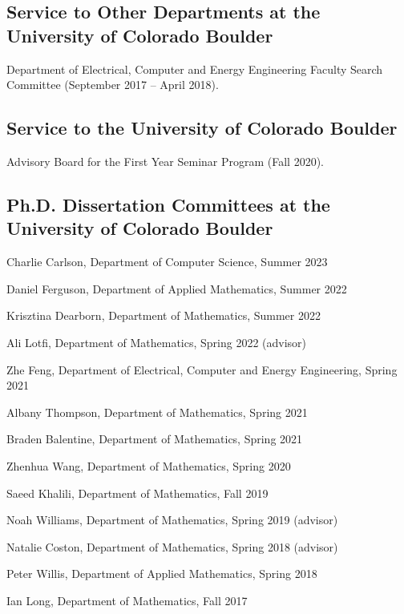 \documentclass[letterpaper]{article}
\renewenvironment{itemize}{
  \begin{list}{}{
    \setlength{\leftmargin}{1em}
  }
}{
  \end{list}
}
\begin{document}
\subsection*{Service to Other Departments at the University of Colorado Boulder} 
\begin{itemize}
	\item Department of Electrical, Computer and Energy Engineering Faculty Search Committee (September 2017 -- April 2018).
\end{itemize}

\subsection*{Service to the University of Colorado Boulder} 
\begin{itemize}
	\item Advisory Board for the First Year Seminar Program (Fall 2020). 
\end{itemize}

\subsection*{Ph.D. Dissertation Committees at the University of Colorado Boulder} 
\begin{itemize}
	\item Charlie Carlson, Department of Computer Science, Summer 2023
	\item Daniel Ferguson, Department of Applied Mathematics, Summer 2022
	\item Krisztina Dearborn, Department of Mathematics, Summer 2022
	\item Ali Lotfi, Department of Mathematics, Spring 2022 (advisor)
	\item Zhe Feng, Department of Electrical, Computer and Energy Engineering, Spring 2021
	\item Albany Thompson, Department of Mathematics, Spring 2021
	\item Braden Balentine, Department of Mathematics, Spring 2021
	\item Zhenhua Wang, Department of Mathematics, Spring 2020 
	\item Saeed Khalili, Department of Mathematics, Fall 2019 
	\item Noah Williams, Department of Mathematics, Spring 2019 (advisor)
	\item Natalie Coston, Department of Mathematics, Spring 2018 (advisor) 
	\item Peter Willis, Department of Applied Mathematics, Spring 2018 
	\item Ian Long, Department of Mathematics, Fall 2017
\end{itemize}
\end{document}
